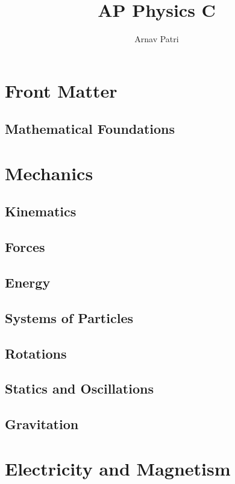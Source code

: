 \documentclass[12pt, A4]{report}
\title{AP Physics C}
\author{Arnav Patri}
\begin{document}
	\maketitle
	\tableofcontents
	\part{Front Matter}
		\chapter{Mathematical Foundations}
			
	\part{Mechanics}
		\chapter{Kinematics}
			
		\chapter{Forces}
			
		\chapter{Energy}
			
		\chapter{Systems of Particles}
			
		\chapter{Rotations}
			
		\chapter{Statics and Oscillations}
			
		\chapter{Gravitation}
			
	\part{Electricity and Magnetism}
\end{document}

